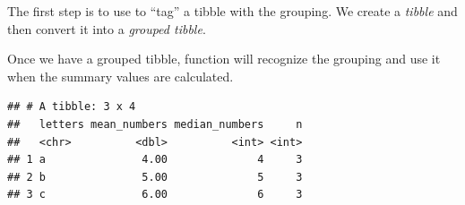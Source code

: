 \documentclass[krantz2,ChapterTOCs]{krantz}\usepackage{knitr}
\begin{document}
The first step is to use  to ``tag'' a tibble with the grouping. We create a \emph{tibble} and then convert it into a \emph{grouped tibble}.

\begin{knitrout}\footnotesize
{}\color{fgcolor}\begin{kframe}
\begin{alltt}
 \hlkwb{<-} \hlstd{(} \hlstd{=} \hlopt{:}\hlstd{,}  \hlstd{=} \hlstd{(letters[}\hlopt{:}\hlstd{],} \hlstd{))}
 \hlkwb{<-} 
\end{alltt}
\end{kframe}
\end{knitrout}

Once we have a grouped tibble, function  will recognize the grouping and use it when the summary values are calculated.

\begin{knitrout}\footnotesize
{}\color{fgcolor}\begin{kframe}
\begin{alltt}
           \hlstd{=} 
           \hlstd{=} 
           \hlstd{=} \hlstd{())}
\end{alltt}
\begin{verbatim}
## # A tibble: 3 x 4
##   letters mean_numbers median_numbers     n
##   <chr>          <dbl>          <int> <int>
## 1 a               4.00              4     3
## 2 b               5.00              5     3
## 3 c               6.00              6     3
\end{verbatim}
\end{kframe}
\end{knitrout}
\end{document}
